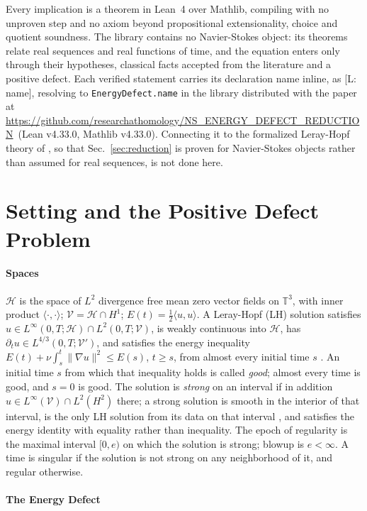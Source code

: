 \documentclass[letterpaper,twocolumn]{article}
\newcommand{\lean}[1]{{\footnotesize\def\_{\textunderscore\allowbreak}%
\hspace{0pt}[L: {\ttfamily\fontdimen3\font=2pt\fontdimen4\font=1pt #1}]}}
\newcommand{\leanrepo}{\url{https://github.com/researchathomology/NS_ENERGY_DEFECT_REDUCTION}}
\newcommand{\T}{\mathbb{T}}
\newcommand{\Hc}{\mathcal{H}}
\newcommand{\Vc}{\mathcal{V}}
\begin{document}
Every implication is a theorem in Lean~4 over Mathlib, compiling with no
unproven step and no axiom beyond propositional extensionality, choice
and quotient soundness. The library contains no Navier-Stokes object: its
theorems relate real sequences and real functions of time, and the
equation enters only through their hypotheses, classical facts accepted
from the literature and a positive defect. Each verified statement
carries its declaration name inline, as \lean{name}, resolving to
\texttt{EnergyDefect.name} in the library distributed with the paper at
\leanrepo\ (Lean v4.33.0, Mathlib v4.33.0). Connecting it to the
formalized Leray-Hopf theory of \cite{Uda26}, so that
Sec.~\ref{sec:reduction} is proven for Navier-Stokes objects rather than
assumed for real sequences, is not done here.

\section{Setting and the Positive Defect Problem}
\label{sec:setting}

\paragraph*{Spaces}

$\Hc$ is the space of $L^2$ divergence free mean zero vector fields on
$\T^3$, with inner product $\langle\cdot,\cdot\rangle$; $\Vc = \Hc \cap
H^1$; $E(t) = \frac12 \langle u, u\rangle$. A Leray-Hopf (LH) solution
satisfies $u \in L^\infty(0,T;\Hc) \cap L^2(0,T;\Vc)$, is weakly
continuous into $\Hc$, has $\partial_t u \in L^{4/3}(0,T;\Vc')$, and
satisfies the energy inequality $E(t) + \nu\int_s^t\|\nabla u\|^2 \leq
E(s)$, $t \geq s$, from almost every initial time $s$
\cite{RobRodSad16}. An initial time $s$ from which that inequality holds
is called \emph{good}; almost every time is good, and $s = 0$ is good.
The solution is \emph{strong} on an interval if in addition $u \in
L^\infty(\Vc) \cap L^2(H^2)$ there; a strong solution is smooth in the
interior of that interval, is the only LH solution from its data on that
interval \cite{Pro59,Ser62}, and satisfies the energy identity with
equality rather than inequality. The epoch of regularity is the maximal
interval $[0,e)$ on which the solution is strong; blowup is $e <
\infty$. A time is singular if the solution is not strong on any
neighborhood of it, and regular otherwise.

\paragraph*{The Energy Defect}
\end{document}
